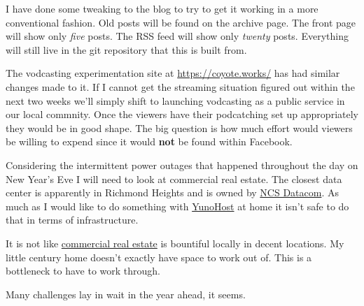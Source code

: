 I have done some tweaking to the blog to try to get it working in a more
conventional fashion. Old posts will be found on the archive page. The
front page will show only \emph{five} posts. The RSS feed will show only
\emph{twenty} posts. Everything will still live in the git repository
that this is built from.

The vodcasting experimentation site at \url{https://coyote.works/} has
had similar changes made to it. If I cannot get the streaming situation
figured out within the next two weeks we'll simply shift to launching
vodcasting as a public service in our local commnity. Once the viewers
have their podcatching set up appropriately they would be in good shape.
The big question is how much effort would viewers be willing to expend
since it would \textbf{not} be found within Facebook.

Considering the intermittent power outages that happened throughout the
day on New Year's Eve I will need to look at commercial real estate. The
closest data center is apparently in Richmond Heights and is owned by
\href{http://www.ncsdata.com/datacenter.html}{NCS Datacom}. As much as I
would like to do something with
\href{https://yunohost.org/en/whatsyunohost?q=\%2Fwhatsyunohost}{YunoHost}
at home it isn't safe to do that in terms of infrastructure.

It is not like
\href{https://commercial.century21.com/real-estate/ashtabula-oh/LCOHASHTABULA/?kw=&pt=1,5,4,6,8}{commercial
real estate} is bountiful locally in decent locations. My little century
home doesn't exactly have space to work out of. This is a bottleneck to
have to work through.

Many challenges lay in wait in the year ahead, it seems.
